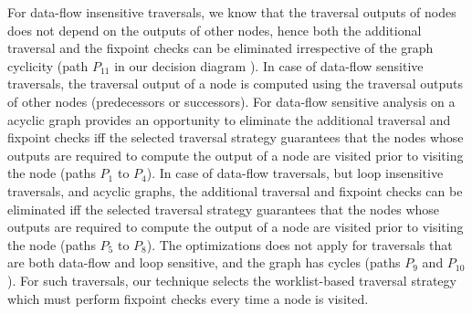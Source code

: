 For data-flow insensitive traversals, we know that the traversal outputs of
nodes does not depend on the outputs of other nodes, hence both the additional
traversal and the fixpoint checks can be eliminated irrespective of the graph
cyclicity (path $P_{11}$ in our decision diagram
).
In case of data-flow sensitive traversals, the traversal output of a node is
computed using the traversal outputs of other nodes (predecessors or
successors). For data-flow sensitive analysis on a acyclic graph provides an
opportunity to eliminate the additional traversal and fixpoint checks iff the
selected traversal strategy guarantees that the nodes whose outputs are required
to compute the output of a node are visited prior to visiting the node (paths
$P_1$ to $P_4$). 
In case of data-flow traversals, but loop insensitive traversals, and acyclic
graphs, the additional traversal and fixpoint checks can be eliminated iff the
selected traversal strategy guarantees that the nodes whose outputs are required
to compute the output of a node are visited prior to visiting the node (paths
$P_5$ to $P_8$).
The optimizations does not apply for traversals that are both data-flow and loop
sensitive, and the graph has cycles (paths $P_9$ and $P_{10}$). For such
traversals, our technique selects the worklist-based traversal strategy which
must perform fixpoint checks every time a node is visited.
% 
% 
% 
